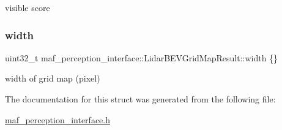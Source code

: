 visible score 

\mbox{\label{structmaf__perception__interface_1_1LidarBEVGridMapResult_a3b8e4f459d30418443e278d59561b37e}} 
\subsubsection{\texorpdfstring{width}{width}}
{\footnotesize\ttfamily uint32\+\_\+t maf\+\_\+perception\+\_\+interface\+::\+Lidar\+B\+E\+V\+Grid\+Map\+Result\+::width \{\}}



width of grid map (pixel) 



The documentation for this struct was generated from the following file\+:\begin{DoxyCompactItemize}
\item 
\hyperlink{maf__perception__interface_8h}{maf\+\_\+perception\+\_\+interface.\+h}\end{DoxyCompactItemize}
